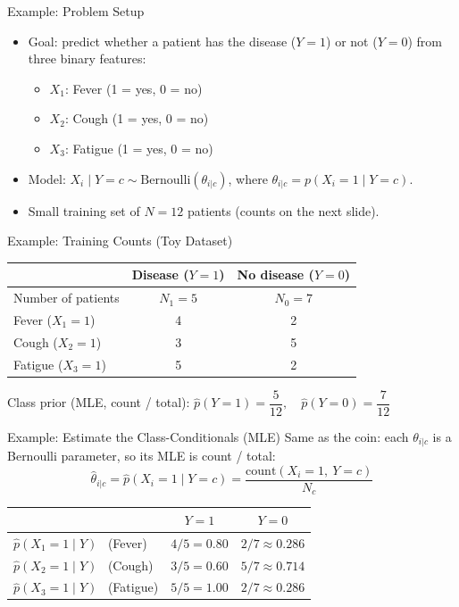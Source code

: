\documentclass[aspectratio=169]{beamer}
\begin{document}
\begin{frame}{Example: Problem Setup}
\begin{itemize}
  \item Goal: predict whether a patient has the disease ($Y=1$) or not ($Y=0$) from three binary features:
  \begin{itemize}
    \item $X_1$: Fever (1 = yes, 0 = no)
    \item $X_2$: Cough (1 = yes, 0 = no)
    \item $X_3$: Fatigue (1 = yes, 0 = no)
  \end{itemize}
  \item Model: $X_i\mid Y=c \sim \mathrm{Bernoulli}(\theta_{i|c})$, where $\theta_{i|c} = p(X_i=1\mid Y=c)$.
  \item Small training set of $N=12$ patients (counts on the next slide).
\end{itemize}
\end{frame}

\begin{frame}{Example: Training Counts (Toy Dataset)}
\centering
\begin{tabular}{l c c}
\toprule
 & Disease ($Y=1$) & No disease ($Y=0$) \\
\midrule
Number of patients & $N_{1}=5$ & $N_{0}=7$ \\
Fever ($X_1=1$)    & 4 & 2 \\
Cough ($X_2=1$)    & 3 & 5 \\
Fatigue ($X_3=1$)  & 5 & 2 \\
\bottomrule
\end{tabular}

\vspace{10pt}
Class prior (MLE, count / total): \quad
\(\hat p(Y=1)=\dfrac{5}{12},\quad \hat p(Y=0)=\dfrac{7}{12}\)
\end{frame}

\begin{frame}{Example: Estimate the Class-Conditionals (MLE)}
Same as the coin: each $\theta_{i|c}$ is a Bernoulli parameter, so its MLE is count / total:
\[
  \hat\theta_{i|c} = \hat p(X_i=1\mid Y=c)=\frac{\text{count}(X_i=1,\ Y=c)}{N_c}
\]
\centering
\begin{tabular}{lcc}
\toprule
 & $Y=1$ & $Y=0$ \\
\midrule
$\hat p(X_1=1\mid Y)$ \ (Fever)   & $4/5 = 0.80$ & $2/7 \approx 0.286$ \\
$\hat p(X_2=1\mid Y)$ \ (Cough)   & $3/5 = 0.60$ & $5/7 \approx 0.714$ \\
$\hat p(X_3=1\mid Y)$ \ (Fatigue) & $5/5 = 1.00$ & $2/7 \approx 0.286$ \\
\bottomrule
\end{tabular}
\end{frame}
\end{document}
